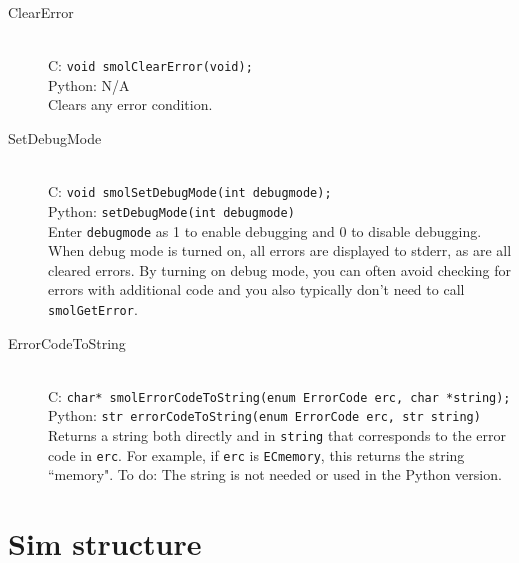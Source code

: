 \documentclass {book}
\begin{document}
\begin{description}
\item[ClearError]
\hfill \\
C: \texttt{void smolClearError(void);}\\
Python: N/A\\
Clears any error condition.

\item[SetDebugMode]
\hfill \\
C: \texttt{void smolSetDebugMode(int debugmode);}\\
Python: \texttt{setDebugMode(int debugmode)}\\
Enter \texttt{debugmode} as 1 to enable debugging and 0 to disable debugging. When debug mode is turned on, all errors are displayed to stderr, as are all cleared errors. By turning on debug mode, you can often avoid checking for errors with additional code and you also typically don't need to call \texttt{smolGetError}.

\item[ErrorCodeToString]
\hfill \\
C: \texttt{char* smolErrorCodeToString(enum ErrorCode erc, char *string);}\\
Python: \texttt{str errorCodeToString(enum ErrorCode erc, str string)}\\
Returns a string both directly and in \texttt{string} that corresponds to the error code in \texttt{erc}. For example, if \texttt{erc} is \texttt{ECmemory}, this returns the string ``memory". To do: The string is not needed or used in the Python version.

\end{description}

\section{Sim structure}
\end{document}
